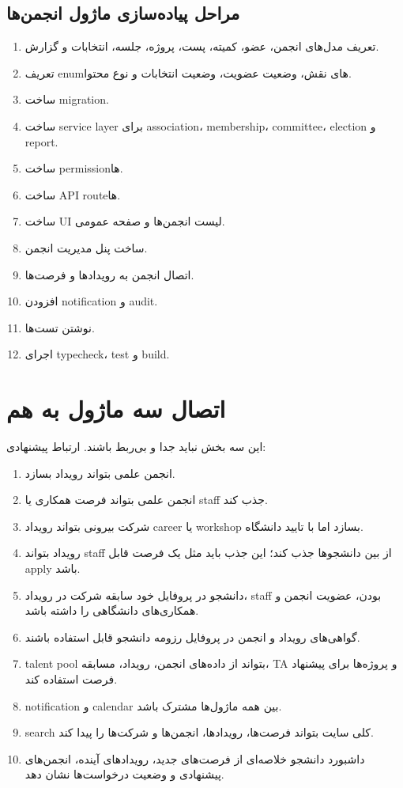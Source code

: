 \documentclass[12pt,a4paper]{article}
\begin{document}
\subsection{مراحل پیاده‌سازی ماژول انجمن‌ها}
\begin{enumerate}
\item تعریف مدل‌های انجمن، عضو، کمیته، پست، پروژه، جلسه، انتخابات و گزارش.
\item تعریف enumهای نقش، وضعیت عضویت، وضعیت انتخابات و نوع محتوا.
\item ساخت migration.
\item ساخت service layer برای association، membership، committee، election و report.
\item ساخت permissionها.
\item ساخت API routeها.
\item ساخت UI لیست انجمن‌ها و صفحه عمومی.
\item ساخت پنل مدیریت انجمن.
\item اتصال انجمن به رویدادها و فرصت‌ها.
\item افزودن notification و audit.
\item نوشتن تست‌ها.
\item اجرای typecheck، test و build.
\end{enumerate}

\section{اتصال سه ماژول به هم}
این سه بخش نباید جدا و بی‌ربط باشند. ارتباط پیشنهادی:
\begin{enumerate}
\item انجمن علمی بتواند رویداد بسازد.
\item انجمن علمی بتواند فرصت همکاری یا staff جذب کند.
\item شرکت بیرونی بتواند رویداد career یا workshop بسازد اما با تایید دانشگاه.
\item رویداد بتواند staff از بین دانشجوها جذب کند؛ این جذب باید مثل یک فرصت قابل apply باشد.
\item دانشجو در پروفایل خود سابقه شرکت در رویداد، staff بودن، عضویت انجمن و همکاری‌های دانشگاهی را داشته باشد.
\item گواهی‌های رویداد و انجمن در پروفایل رزومه دانشجو قابل استفاده باشند.
\item talent pool بتواند از داده‌های انجمن، رویداد، مسابقه، TA و پروژه‌ها برای پیشنهاد فرصت استفاده کند.
\item notification و calendar بین همه ماژول‌ها مشترک باشد.
\item search کلی سایت بتواند فرصت‌ها، رویدادها، انجمن‌ها و شرکت‌ها را پیدا کند.
\item داشبورد دانشجو خلاصه‌ای از فرصت‌های جدید، رویدادهای آینده، انجمن‌های پیشنهادی و وضعیت درخواست‌ها نشان دهد.
\end{enumerate}
\end{document}
